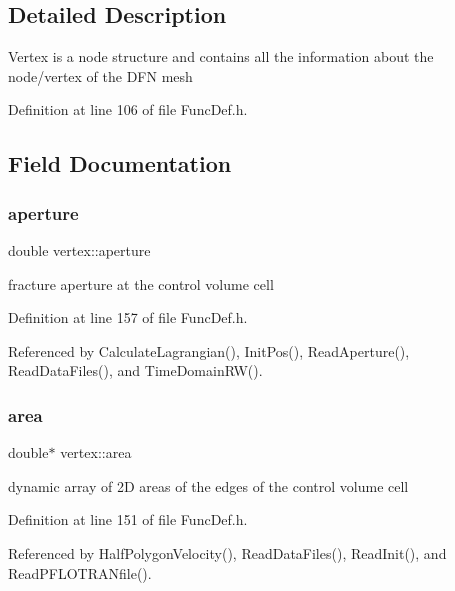 \subsection{Detailed Description}
Vertex is a node structure and contains all the information about the node/vertex of the D\+FN mesh 

Definition at line 106 of file Func\+Def.\+h.



\subsection{Field Documentation}
\mbox{\label{structvertex_a7588fad77cf759d8db0957c9e957e23a}} 
\subsubsection{\texorpdfstring{aperture}{aperture}}
{\footnotesize\ttfamily double vertex\+::aperture}

fracture aperture at the control volume cell 

Definition at line 157 of file Func\+Def.\+h.



Referenced by Calculate\+Lagrangian(), Init\+Pos(), Read\+Aperture(), Read\+Data\+Files(), and Time\+Domain\+R\+W().

\mbox{\label{structvertex_aff6495cfbefb8dffd8714d7c68810ca6}} 
\subsubsection{\texorpdfstring{area}{area}}
{\footnotesize\ttfamily double$\ast$ vertex\+::area}

dynamic array of 2D areas of the edges of the control volume cell 

Definition at line 151 of file Func\+Def.\+h.



Referenced by Half\+Polygon\+Velocity(), Read\+Data\+Files(), Read\+Init(), and Read\+P\+F\+L\+O\+T\+R\+A\+Nfile().

\mbox{\label{structvertex_a583032cadaa99e8f5c044d3bd10191cf}} 

